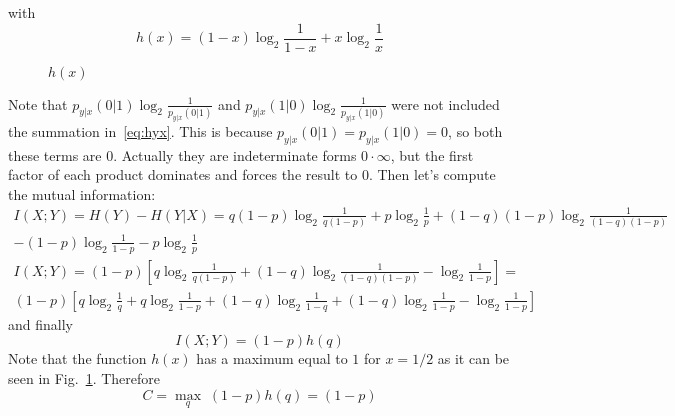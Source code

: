\documentclass[10pt]{article}
\begin{document}
with 
\begin{equation}
	h(x) = (1-x)\log_2\frac{1}{1-x} + x\log_2\frac{1}{x}
\end{equation}
\begin{figure}[h]
\centering
{} 
\caption{$h(x)$}
\label{fig:hx}
\end{figure}

Note that $p_{y|x}(0|1)\log_2\frac{1}{p_{y|x}(0|1)}$ and $p_{y|x}(1|0)\log_2\frac{1}{p_{y|x}(1|0)}$ were not included the summation in~\eqref{eq:hyx}. This is because $p_{y|x}(0|1) = p_{y|x}(1|0) = 0$, so both these terms are 0. Actually they are indeterminate forms $0\cdot\infty$, but the first factor of each product dominates and forces the result to 0.
Then let's compute the mutual information:
\begin{multline}
	I(X;Y) = H(Y) - H(Y|X) = q(1-p)\log_2\frac{1}{q(1-p)} + p\log_2\frac{1}{p} + (1-q)(1-p)\log_2\frac{1}{(1-q)(1-p)} \\ - (1-p)\log_2\frac{1}{1-p} - p\log_2\frac{1}{p}
\end{multline}
\begin{multline}
	I(X;Y) = (1-p)\left[q\log_2\frac{1}{q(1-p)} + (1-q)\log_2\frac{1}{(1-q)(1-p)} - \log_2\frac{1}{1-p} \right] = \\
		(1-p)\left[q\log_2\frac{1}{q} + q\log_2\frac{1}{1-p} + (1-q)\log_2\frac{1}{1-q} + (1-q)\log_2\frac{1}{1-p} - \log_2\frac{1}{1-p} \right]
\end{multline}
and finally
\begin{equation}
	I(X;Y) = (1-p)h(q)
\end{equation}
Note that the function $h(x)$ has a maximum equal to $1$ for $x=1/2$ as it can be seen in Fig.~\ref{fig:hx}. Therefore
\begin{equation}
	C = \max_{q} \; (1-p)h(q) = (1-p)
\end{equation}
\end{document}
